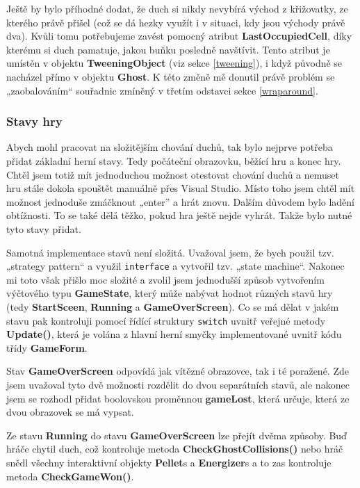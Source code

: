 \documentclass[a4]{article}
\begin{document}
Ještě by bylo příhodné dodat, že duch si nikdy nevybírá východ z křižovatky, ze kterého právě přišel (což se dá hezky využít i v situaci, kdy jsou východy právě dva). Kvůli tomu potřebujeme zavést pomocný atribut \textbf{LastOccupiedCell}, díky kterému si duch pamatuje, jakou buňku posledně navštívit. Tento atribut je umístěn v objektu \textbf{TweeningObject} (viz sekce \ref{tweening}), i když původně se nacházel přímo v objektu \textbf{Ghost}. K této změně mě donutil právě problém se „zaobalováním“ souřadnic zmíněný v třetím odstavci sekce \ref{wraparound}.

\subsubsection{Stavy hry} \label{gamestates}
Abych mohl pracovat na složitějším chování duchů, tak bylo nejprve potřeba přidat základní herní stavy. Tedy počáteční obrazovku, běžící hru a konec hry. Chtěl jsem totiž mít jednoduchou možnost otestovat chování duchů a nemuset hru stále dokola spouštět manuálně přes Visual Studio. Místo toho jsem chtěl mít možnost jednoduše zmáčknout „enter” a hrát znovu. Dalším důvodem bylo ladění obtížnosti. To se také dělá těžko, pokud hra ještě nejde vyhrát. Takže bylo nutné tyto stavy přidat.

Samotná implementace stavů není složitá. Uvažoval jsem, že bych použil tzv. „strategy pattern“ a využil \verb|interface| a vytvořil tzv. „state machine“. Nakonec mi toto však přišlo moc složité a zvolil jsem jednodušší způsob vytvořením výčtového typu \textbf{GameState}, který může nabývat hodnot různých stavů hry (tedy \textbf{StartSceen}, \textbf{Running} a \textbf{GameOverScreen}). Co se má dělat v jakém stavu pak kontroluji pomocí řídící struktury \verb|switch| uvnitř veřejné metody \textbf{Update()}, která je volána z hlavní herní smyčky implementované uvnitř kódu třídy \textbf{GameForm}. 

Stav \textbf{GameOverScreen} odpovídá jak vítězné obrazovce, tak i té poražené. Zde jsem uvažoval tyto dvě možnosti rozdělit do dvou separátních stavů, ale nakonec jsem se rozhodl přidat boolovskou proměnnou \textbf{gameLost}, která určuje, která ze dvou obrazovek se má vypsat.

Ze stavu \textbf{Running} do stavu \textbf{GameOverScreen} lze přejít dvěma způsoby. Buď hráče chytil duch, což kontroluje metoda \textbf{CheckGhostCollisions()} nebo hráč snědl všechny interaktivní objekty \textbf{Pellet}s a \textbf{Energizer}s a to zas kontroluje metoda \textbf{CheckGameWon()}.
\end{document}
